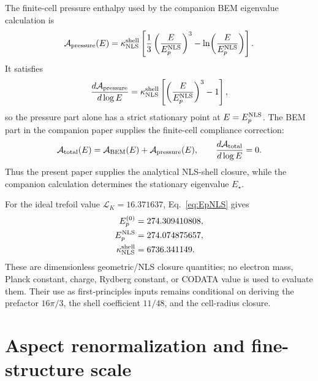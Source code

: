 \documentclass[11pt]{article}
\newcommand{\EpNLS}{E_p^{\rm NLS}}
\newcommand{\kappaNLS}{\kappa_{\rm NLS}^{\rm shell}}
\begin{document}
The finite-cell pressure enthalpy used by the companion BEM eigenvalue calculation is
\begin{equation}
  \mathcal A_{\rm pressure}(E)
  =
  \kappaNLS
  \left[
    \frac{1}{3}\left(\frac{E}{\EpNLS}\right)^3
    -
    \ln\!\left(\frac{E}{\EpNLS}\right)
  \right].
  \label{eq:pressure-action-nls}
\end{equation}
It satisfies
\begin{equation}
  \frac{d\mathcal A_{\rm pressure}}{d\log E}
  =
  \kappaNLS
  \left[
    \left(\frac{E}{\EpNLS}\right)^3-1
  \right],
  \label{eq:pressure-derivative-nls}
\end{equation}
so the pressure part alone has a strict stationary point at \(E=\EpNLS\).  The BEM part in
the companion paper supplies the finite-cell compliance correction:
\begin{equation}
  \mathcal A_{\rm total}(E)
  =
  \mathcal A_{\rm BEM}(E)
  +
  \mathcal A_{\rm pressure}(E),
  \qquad
  \frac{d\mathcal A_{\rm total}}{d\log E}=0.
  \label{eq:total-action-nls}
\end{equation}
Thus the present paper supplies the analytical NLS-shell closure, while the companion
calculation determines the stationary eigenvalue \(E_\star\).

For the ideal trefoil value \(\mathcal L_K=16.371637\), Eq.~\eqref{eq:EpNLS} gives
\begin{align}
  E_p^{(0)} &= 274.309410808,\\
  \EpNLS &= 274.074875657,\\
  \kappaNLS &= 6736.341149.
\end{align}
These are dimensionless geometric/NLS closure quantities; no electron mass, Planck constant, charge,
Rydberg constant, or CODATA value is used to evaluate them.  Their use as first-principles inputs remains conditional on deriving the prefactor \(16\pi/3\), the shell coefficient \(11/48\), and the cell-radius closure.

\section{Aspect renormalization and fine-structure scale}
\label{sec:aspect}
\end{document}

